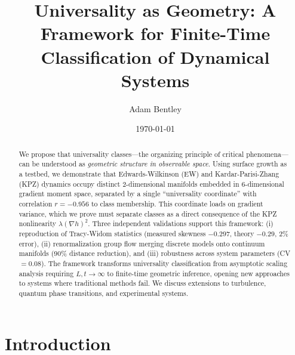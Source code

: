 \documentclass[aps,pre,twocolumn,superscriptaddress,showpacs,longbibliography]{revtex4-2}
\begin{document}
\title{Universality as Geometry: A Framework for Finite-Time Classification of Dynamical Systems}

\author{Adam Bentley}

\date{\today}

\begin{abstract}
We propose that universality classes---the organizing principle of critical phenomena---can be understood as \emph{geometric structure in observable space}. Using surface growth as a testbed, we demonstrate that Edwards-Wilkinson (EW) and Kardar-Parisi-Zhang (KPZ) dynamics occupy distinct 2-dimensional manifolds embedded in 6-dimensional gradient moment space, separated by a single ``universality coordinate'' with correlation $r = -0.956$ to class membership. This coordinate loads on gradient variance, which we prove must separate classes as a direct consequence of the KPZ nonlinearity $\lambda(\nabla h)^2$. Three independent validations support this framework: (i) reproduction of Tracy-Widom statistics (measured skewness $-0.297$, theory $-0.29$, 2\% error), (ii) renormalization group flow merging discrete models onto continuum manifolds (90\% distance reduction), and (iii) robustness across system parameters (CV $= 0.08$). The framework transforms universality classification from asymptotic scaling analysis requiring $L, t \to \infty$ to finite-time geometric inference, opening new approaches to systems where traditional methods fail. We discuss extensions to turbulence, quantum phase transitions, and experimental systems.
\end{abstract}


\maketitle

\section{Introduction}
\label{sec:introduction}
\end{document}
